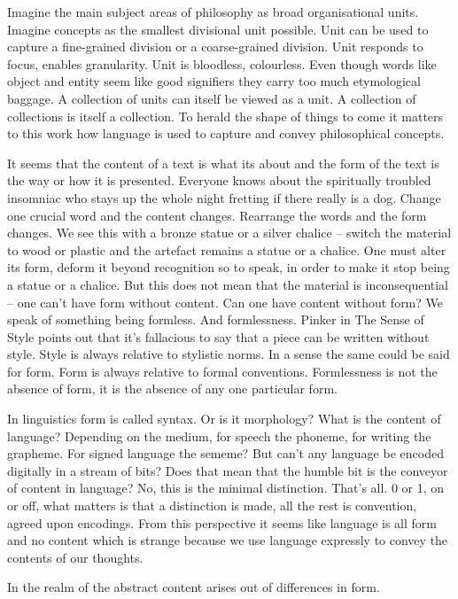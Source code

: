 \documentclass[dah,phd,a4paper]{xe_uccthesis}
\begin{document}
Imagine the main subject areas of philosophy as broad organisational units. Imagine concepts as the smallest divisional unit possible. Unit can be used to capture a fine-grained division or a coarse-grained division. Unit responds to focus, enables granularity. Unit is bloodless, colourless. Even though words like object and entity seem like good signifiers they carry too much etymological baggage. A collection of units can itself be viewed as a unit. A collection of collections is itself a collection. To herald the shape of things to come it matters to this work how language is used to capture and convey philosophical concepts.

It seems that the content of a text is what its about and the form of the text is the way or how it is presented. Everyone knows about the spiritually troubled insomniac who stays up the whole night fretting if there really is a dog. Change one crucial word and the content changes. Rearrange the words and the form changes. We see this with a bronze statue or a silver chalice – switch the material to wood or plastic and the artefact remains a statue or a chalice. One must alter its form, deform it beyond recognition so to speak, in order to make it stop being a statue or a chalice. But this does not mean that the material is inconsequential – one can't have form without content. Can one have content without form? We speak of something being formless. And formlessness. Pinker in The Sense of Style points out that it's fallacious to say that a piece can be written without style. Style is always relative to stylistic norms. In a sense the same could be said for form. Form is always relative to formal conventions. Formlessness is not the absence of form, it is the absence of any one particular form.

In linguistics form is called syntax. Or is it morphology? What is the content of language? Depending on the medium, for speech the phoneme, for writing the grapheme. For signed language the sememe? But can't any language be encoded digitally in a stream of bits? Does that mean that the humble bit is the conveyor of content in language? No, this is the minimal distinction. That's all. 0 or 1, on or off, what matters is that a distinction is made, all the rest is convention, agreed upon encodings. From this perspective it seems like language is all form and no content which is strange because we use language expressly to convey the contents of our thoughts.

In the realm of the abstract content arises out of differences in form.
\end{document}

